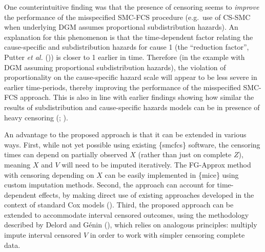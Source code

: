 \documentclass[
  letterpaper,
  DIV=11,
  numbers=noendperiod]{scrreprt}
\begin{document}
One counterintuitive finding was that the presence of censoring seems to
\emph{improve} the performance of the misspecified SMC-FCS procedure
(e.g.~use of CS-SMC when underlying DGM assumes proportional
subdistribution hazards). An explanation for this phenomenon is that the
time-dependent factor relating the cause-specific and subdistribution
hazards for cause 1 (the ``reduction factor'', Putter \emph{et al.}
()) is closer
to 1 earlier in time. Therefore (in the example with DGM assuming
proportional subdistribution hazards), the violation of proportionality
on the cause-specific hazard scale will appear to be less severe in
earlier time-periods, thereby improving the performance of the
misspecified SMC-FCS approach. This is also in line with earlier
findings showing how similar the results of subdistribution and
cause-specific hazards models can be in presence of heavy censoring
(;
).

An advantage to the proposed approach is that it can be extended in
various ways. First, while not yet possible using existing \{smcfcs\}
software, the censoring times can depend on partially observed \(X\)
(rather than just on complete \(Z\)), meaning \(X\) and \(V\) will need
to be imputed iteratively. The FG-Approx method with censoring depending
on \(X\) can be easily implemented in \{mice\} using custom imputation
methods. Second, the approach can account for time-dependent effects, by
making direct use of existing approaches developed in the context of
standard Cox models (). Third, the proposed approach can be extended to
accommodate interval censored outcomes, using the methodology described
by Delord and Génin
(), which
relies on analogous principles: multiply impute interval censored \(V\)
in order to work with simpler censoring complete data.
\end{document}

